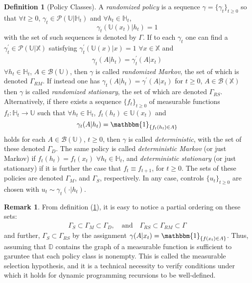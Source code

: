 \documentclass[12pt, oneside]{report}
\newcommand{\mbb}[1]{\mathbb{#1}}
\newcommand{\1}[1]{\mathbbm{1}_{\{#1\}}}
\newcommand{\mc}[1]{\mathcal{#1}}
\theoremstyle{definition}
\newtheorem{definition}[theorem]{Definition}
\newtheorem{remark}[theorem]{Remark}
\begin{document}
\begin{definition}[Policy Classes]\label{def26} A {\it randomized policy} is a
    sequence $\gamma=\{\gamma_t\}_{t\geq 0}$ so that $\forall t\geq 0$,
    $\gamma_t\in\mc{P}(\mbb{U}|\mbb{H}_t)$ and $\forall h_t\in\mbb{H}_t$,
    \[\gamma_t(\mbb{U}(x_t)|h_t)=1\] with the set of such sequences is denoted
    by $\Gamma$. If to each $\gamma_t$ one can find a
    $\gamma^\prime_t\in\mc{P}(\mbb{U}|\mbb{X})$ satisfying
    $\gamma^\prime_t(\mbb{U}(x)|x)=1$ $\forall x\in\mbb{X}$ and
    \begin{align}
        \gamma_t(A|h_t)=\gamma^\prime_t(A|x_t)\label{eq7}
    \end{align}
    $\forall h_t\in\mbb{H}_t$, $A\in\mc{B}(\mbb{U})$, then $\gamma$ is called
    {\it randomized Markov}, the set of which is denoted $\Gamma_{RM}$. If
    instead one has $\gamma_t(A|h_t)=\gamma^\prime(A|x_t)$ for $t\geq 0$,
    $A\in\mc{B}(\mbb{X})$ then $\gamma$ is called {\it randomized stationary},
    the set of which are denoted $\Gamma_{RS}$.\\[5pt]
    Alternatively, if there exists a sequence $\{f_t\}_{t\geq 0}$ of measurable
    functions $f_t:\mbb{H}_t\rightarrow\mbb{U}$ such that $\forall
    h_t\in\mbb{H}_t$, $f_t(h_t)\in\mbb{U}(x_t)$ and
    \[\gamma_t(A|h_t)=\1{f_t(h_t)\in A}\] holds for each $A\in\mc{B}(\mbb{U})$,
    $t\geq 0$, then $\gamma$ is called {\it deterministic}, with the set of
    these denoted $\Gamma_D$. The same policy is called {\it deterministic
    Markov} (or just Markov) if $f_t(h_t)=f_t(x_t)$ $\forall h_t\in\mbb{H}_t$,
    and {\it deterministic stationary} (or just stationary) if it is further the
    case that $f_t\equiv f_{t+1}$, for $t\geq 0$. The sets of these policies are
    denoted $\Gamma_M$, and $\Gamma_S$, respectively. In any case, controls
    $\{u_t\}_{t\geq 0}$ are chosen with $u_t\sim\gamma_t(\cdot|h_t)$.
\end{definition}
\begin{remark}
    From definition (\ref{def26}), it is easy to notice a partial ordering on
    these sets:
    \begin{align}
        \Gamma_S\subset\Gamma_M\subset\Gamma_D, \quad\text{and}\quad \Gamma_{RS}\subset\Gamma_{RM}\subset\Gamma
    \end{align}
    and further, $\Gamma_S\subset\Gamma_{RS}$ by the assignment
    $\gamma(A|x_t)=\1{f(x_t)\in A}$. Thus, assuming that $\mbb{D}$ contains the
    graph of a measurable function is sufficient to garuntee that each policy
    class is nonempty. This is called the measurable selection hypothesis, and
    it is a technical necessity to verify conditions under which it holds for
    dynamic programming recursions to be well-defined.
\end{remark}
\end{document}
